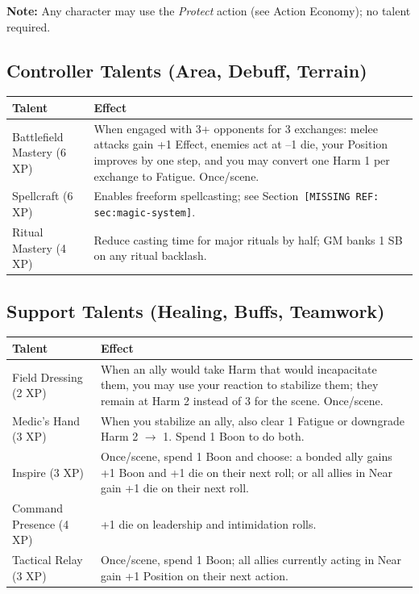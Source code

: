 \textbf{Note:} Any character may use the \textit{Protect} action (see Action Economy); no talent required.

\subsection{Controller Talents (Area, Debuff, Terrain)}

\begin{tabular}{@{}lp{10cm}@{}}
\toprule
\textbf{Talent} & \textbf{Effect} \\
\midrule
Battlefield Mastery (6 XP) & When engaged with 3+ opponents for 3 exchanges: melee attacks gain +1 Effect, enemies act at --1 die, your Position improves by one step, and you may convert one Harm 1 per exchange to Fatigue. Once/scene. \\
Spellcraft (6 XP) & Enables freeform spellcasting; see Section~\texttt{[MISSING REF: sec:magic-system]}. \\
Ritual Mastery (4 XP) & Reduce casting time for major rituals by half; GM banks 1 SB on any ritual backlash. \\
\bottomrule
\end{tabular}

\subsection{Support Talents (Healing, Buffs, Teamwork)}

\begin{tabular}{@{}lp{10cm}@{}}
\toprule
\textbf{Talent} & \textbf{Effect} \\
\midrule
Field Dressing (2 XP) & When an ally would take Harm that would incapacitate them, you may use your reaction to stabilize them; they remain at Harm 2 instead of 3 for the scene. Once/scene. \\
Medic's Hand (3 XP) & When you stabilize an ally, also clear 1 Fatigue or downgrade Harm 2 $\rightarrow$ 1. Spend 1 Boon to do both. \\
Inspire (3 XP) & Once/scene, spend 1 Boon and choose: a bonded ally gains +1 Boon and +1 die on their next roll; or all allies in Near gain +1 die on their next roll. \\
Command Presence (4 XP) & +1 die on leadership and intimidation rolls. \\
Tactical Relay (3 XP) & Once/scene, spend 1 Boon; all allies currently acting in Near gain +1 Position on their next action. \\
\bottomrule
\end{tabular}

